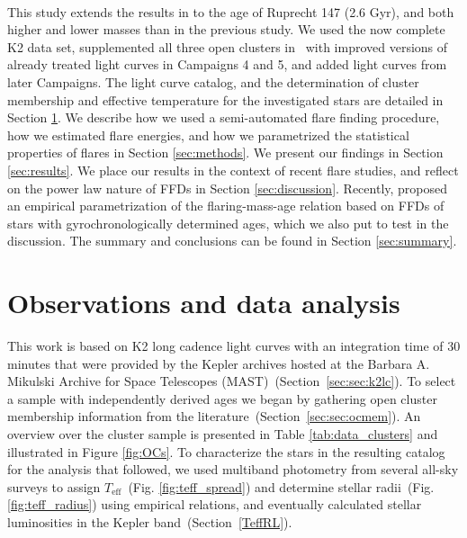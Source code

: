 \documentclass{aa}
\begin{document}
\\
This study extends the results in  to the age of Ruprecht 147 (2.6 Gyr), and both higher and lower masses than in the previous study. We used the now complete K2 data set, supplemented all three open clusters in~ with improved versions of already treated light curves in Campaigns 4 and 5, and added light curves from later Campaigns. The light curve catalog, and the determination of cluster membership and effective temperature for the investigated stars are detailed in Section \ref{sec:data}. We describe how we used a semi-automated flare finding procedure, how we estimated flare energies, and how we parametrized the statistical properties of flares in Section \ref{sec:methods}. We present our findings in Section \ref{sec:results}. We place our results in the context of recent flare studies, and reflect on the power law nature of FFDs in Section \ref{sec:discussion}. Recently, \citet{davenport2019} proposed an empirical parametrization of the flaring-mass-age relation based on FFDs of stars with gyrochronologically determined ages, which we also put to test in the discussion. The summary and conclusions can be found in Section \ref{sec:summary}.
\section{Observations and data analysis}
\label{sec:data}
This work is based on K2 long cadence light curves with an integration time of 30 minutes that were provided by the Kepler archives hosted at the Barbara A. Mikulski Archive for Space Telescopes (MAST)~(Section~\ref{sec:sec:k2lc}). To select a sample with independently derived ages we began by gathering open cluster membership information from the literature~(Section~\ref{sec:sec:ocmem}). An overview over the cluster sample is presented in Table \ref{tab:data_clusters} and illustrated in Figure \ref{fig:OCs}. To characterize the stars in the resulting catalog for the analysis that followed, we used multiband photometry from several all-sky surveys to assign $T_\mathrm{eff}$~(Fig. \ref{fig:teff_spread}) and determine stellar radii~(Fig. \ref{fig:teff_radius}) using empirical relations, and eventually calculated stellar luminosities in the Kepler band~(Section~\ref{TeffRL}).
\end{document}
